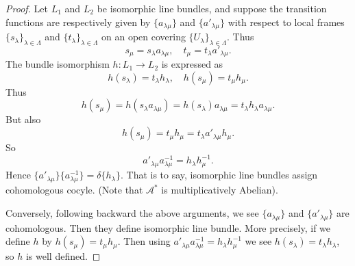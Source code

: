 \documentclass[12pt]{article}
\begin{document}
\begin{proof}
  Let \(L_1\) and \(L_2\) be isomorphic line bundles, and suppose the transition
  functions are respectively given by \(\{a_{\lambda\mu}\}\) and \(\{a'_{\lambda\mu}\}
  \) with respect to local frames \(\{s_{\lambda}\}_{\lambda\in \Lambda}\) and
  \(\{t_{\lambda}\}_{\lambda\in\Lambda}\) on an open covering \(\{U_\lambda\}_{\lambda
  \in \Lambda}\). Thus \[
    s_{\mu}=s_{\lambda}a_{\lambda\mu},\quad
    t_{\mu}=t_{\lambda}a'_{\lambda\mu}
  .\] The bundle isomorphism \(h\colon L_1\to L_2\) is expressed as \[
    h(s_\lambda)=t_\lambda h_\lambda,\quad
    h(s_\mu)=t_\mu h_\mu
  .\] Thus \[
    h(s_\mu)=h(s_\lambda a_{\lambda\mu})=h(s_\lambda)a_{\lambda\mu}
    =t_\lambda h_\lambda a_{\lambda\mu}
  .\] But also \[
    h(s_\mu)=t_\mu h_\mu=t_\lambda a'_{\lambda\mu}h_\mu
  .\] So \[
    a'_{\lambda\mu}a_{\lambda\mu}^{-1}=h_\lambda h_\mu^{-1}
  .\] Hence \(\{a'_{\lambda\mu}\}\{a_{\lambda\mu}^{-1}\}=\delta\{h_{\lambda}\}\).
  That is to say, isomorphic line bundles assign cohomologous cocyle.
  (Note that \(\mathscr{A}^*\) is multiplicatively Abelian).
  
  Conversely, following backward the above arguments, we see \(\{a_{\lambda\mu}\}\)
  and \(\{a'_{\lambda\mu}\}\) are cohomologous. Then they define isomorphic line
  bundle. More precisely, if we define \(h\) by \(h(s_\mu)=t_\mu h_\mu\). Then
  using \(a'_{\lambda\mu}a_{\lambda\mu}^{-1}=h_\lambda h_\mu^{-1}\) we see
  \(h(s_\lambda)=t_\lambda h_\lambda\), so \(h\) is well defined.
\end{proof}
\end{document}
